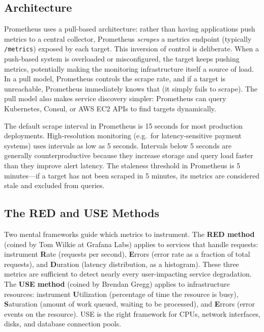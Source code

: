 \documentclass[11pt,a4paper]{article}
\begin{document}
\subsection{Architecture}

Prometheus uses a pull-based architecture: rather than having applications push metrics to a central collector, Prometheus \emph{scrapes} a metrics endpoint (typically \texttt{/metrics}) exposed by each target. This inversion of control is deliberate. When a push-based system is overloaded or misconfigured, the target keeps pushing metrics, potentially making the monitoring infrastructure itself a source of load. In a pull model, Prometheus controls the scrape rate, and if a target is unreachable, Prometheus immediately knows that (it simply fails to scrape). The pull model also makes service discovery simpler: Prometheus can query Kubernetes, Consul, or AWS EC2 APIs to find targets dynamically.

The default scrape interval in Prometheus is 15 seconds for most production deployments. High-resolution monitoring (e.g.\ for latency-sensitive payment systems) uses intervals as low as 5 seconds. Intervals below 5 seconds are generally counterproductive because they increase storage and query load faster than they improve alert latency. The staleness threshold in Prometheus is 5 minutes---if a target has not been scraped in 5 minutes, its metrics are considered stale and excluded from queries.

\subsection{The RED and USE Methods}

Two mental frameworks guide which metrics to instrument. The \textbf{RED method} (coined by Tom Wilkie at Grafana Labs) applies to services that handle requests: instrument \textbf{R}ate (requests per second), \textbf{E}rrors (error rate as a fraction of total requests), and \textbf{D}uration (latency distribution, as a histogram). These three metrics are sufficient to detect nearly every user-impacting service degradation. The \textbf{USE method} (coined by Brendan Gregg) applies to infrastructure resources: instrument \textbf{U}tilization (percentage of time the resource is busy), \textbf{S}aturation (amount of work queued, waiting to be processed), and \textbf{E}rrors (error events on the resource). USE is the right framework for CPUs, network interfaces, disks, and database connection pools.
\end{document}
